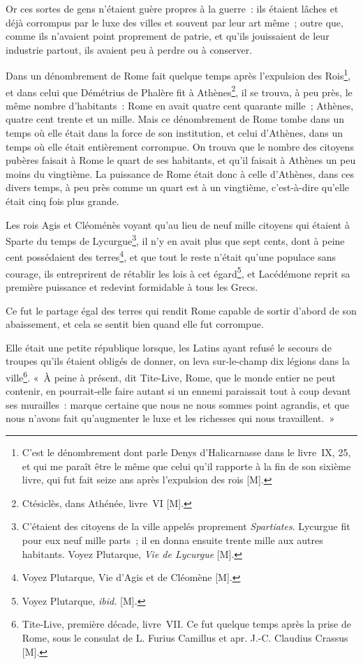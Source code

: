 \documentclass[french,twoside]{book} %
\begin{document}
Or ces sortes de gens n’étaient guère propres à la guerre : ils étaient lâches et déjà corrompus par le luxe des villes et souvent par leur art même ; outre que, comme ils n’avaient point proprement de patrie, et qu’ils jouissaient de leur industrie partout, ils avaient peu à perdre ou à conserver.\par
Dans un dénombrement de Rome fait quelque temps après l’expulsion des Rois\footnote{C’est le dénombrement dont parle Denys d’Halicarnasse dans le livre IX, 25, et qui me paraît être le même que celui qu’il rapporte à la fin de son sixième livre, qui fut fait seize ans après l’expulsion des rois [M].}, et dans celui que Démétrius de Phalère fit à Athènes\footnote{Ctésiclès, dans Athénée, livre VI [M].}, il se trouva, à peu près, le même nombre d’habitants : Rome en avait quatre cent quarante mille ; Athènes, quatre cent trente et un mille. Mais ce dénombrement de Rome tombe dans un temps où elle était dans la force de son institution, et celui d’Athènes, dans un temps où elle était entièrement corrompue. On trouva que le nombre des citoyens pubères faisait à Rome le quart de ses habitants, et qu’il faisait à Athènes un peu moins du vingtième. La puissance de Rome était donc à celle d’Athènes, dans ces divers temps, à peu près comme un quart est à un vingtième, c’est-à-dire qu’elle était cinq fois plus grande.\par
Les rois Agis et Cléoménès voyant qu’au lieu de neuf mille citoyens qui étaient à Sparte du temps de Lycurgue\footnote{C’étaient des citoyens de la ville appelés proprement {\itshape Spartiates}. Lycurgue fit pour eux neuf mille parts ; il en donna ensuite trente mille aux autres habitants. Voyez Plutarque, {\itshape Vie de Lycurgue} [M].}, il n’y en avait plus que sept cents, dont à peine cent possédaient des terres\footnote{Voyez Plutarque, Vie d’Agis et de Cléomène [M].}, et que tout le reste n’était qu’une populace sans courage, ils entreprirent de rétablir les lois à cet égard\footnote{Voyez Plutarque, {\itshape ibid.} [M].}, et Lacédémone reprit sa première puissance et redevint formidable à tous les Grecs.\par
Ce fut le partage égal des terres qui rendit Rome capable de sortir d’abord de son abaissement, et cela se sentit bien quand elle fut corrompue.\par
Elle était une petite république lorsque, les Latins ayant refusé le secours de troupes qu’ils étaient obligés de donner, on leva sur-le-champ dix légions dans la ville\footnote{Tite-Live, première décade, livre VII. Ce fut quelque temps après la prise de Rome, sous le consulat de L. Furius Camillus et apr. J.-C. Claudius Crassus [M].}. « À peine à présent, dit Tite-Live, Rome, que le monde entier ne peut contenir, en pourrait-elle faire autant si un ennemi paraissait tout à coup devant ses murailles : marque certaine que nous ne nous sommes point agrandis, et que nous n’avons fait qu’augmenter le luxe et les richesses qui nous travaillent. »\par
\end{document}
